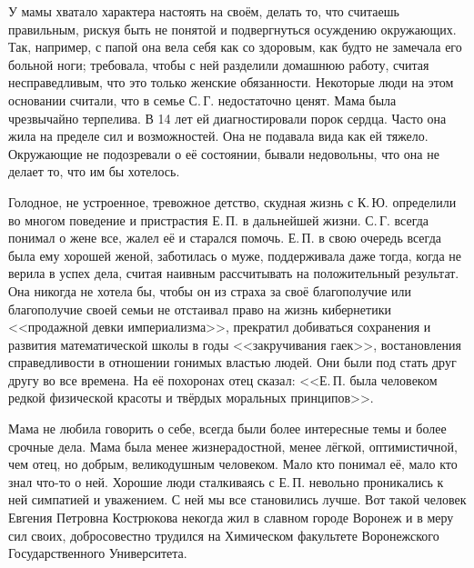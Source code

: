 У мамы хватало характера настоять на своём, делать то, что считаешь правильным, рискуя быть не понятой и подвергнуться осуждению окружающих. Так, например, с папой она вела себя как со здоровым, как будто не замечала его больной ноги; требовала, чтобы с ней разделили домашнюю работу, считая несправедливым, что это только женские обязанности. Некоторые люди на этом основании считали, что в семье С.\,Г. недостаточно ценят.
Мама была чрезвычайно терпелива. В 14 лет ей диагностировали порок сердца. Часто она жила на пределе сил и возможностей. Она не подавала вида как ей тяжело. Окружающие не подозревали о её состоянии, бывали недовольны, что она не делает то, что им бы хотелось.

Голодное, не устроенное, тревожное детство, скудная
\linebreak
жизнь с К.\,Ю. определили во многом поведение и пристрастия Е.\,П. в дальнейшей жизни.
С.\,Г. всегда понимал о жене все, жалел её и старался помочь. Е.\,П. в свою очередь всегда была ему хорошей женой, заботилась о муже, поддерживала даже тогда, когда не верила в успех дела, считая наивным рассчитывать на положительный результат. Она никогда не хотела бы, чтобы он из страха за своё благополучие или благополучие своей семьи не отстаивал право на жизнь кибернетики <<продажной девки империализма>>, прекратил добиваться сохранения и развития математической школы в годы <<закручивания гаек>>, востановления справедливости в отношении гонимых властью людей. Они были под стать друг другу во все времена. На её похоронах отец сказал: <<Е.\,П. была человеком редкой физической красоты и твёрдых моральных принципов>>.

Мама не любила говорить о себе, всегда были более интересные темы и более срочные дела. Мама была менее жизнерадостной, менее лёгкой, оптимистичной, чем отец, но добрым, великодушным человеком. Мало кто понимал её, мало кто знал что-то о ней. Хорошие люди сталкиваясь с Е.\,П. невольно проникались к ней симпатией и уважением. С ней мы все становились лучше.
Вот такой человек Евгения Петровна Кострюкова некогда жил в славном городе Воронеж и в меру сил своих, добросовестно трудился на Химическом факультете Воронежского Государственного Университета.
